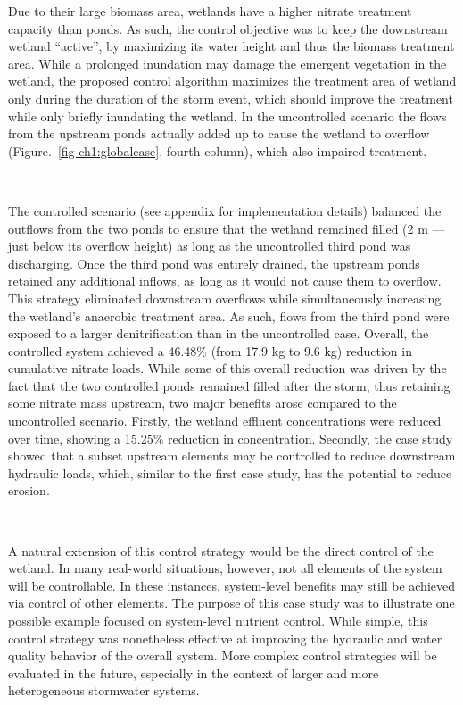Due to their large biomass area, wetlands have a higher nitrate treatment capacity than ponds\cite{Scholes2008APotentials}. 
As such, the control objective was to keep the downstream wetland ``active'', by
maximizing its water height and thus the biomass treatment area. While a prolonged  inundation may damage the emergent vegetation in the wetland, the proposed control algorithm maximizes the treatment area of wetland only during the duration of the storm event, which should improve the treatment while only briefly inundating the wetland.
In the uncontrolled scenario the flows from the upstream ponds actually added up to cause the wetland to overflow (Figure.~\ref{fig-ch1:globalcase}, fourth column), which also impaired treatment. 

\

The controlled scenario (see appendix for implementation details) balanced the outflows from the two ponds to ensure that the wetland remained filled (2 m --- just below its overflow height) as long as the uncontrolled third pond was discharging. Once the third pond was entirely drained, the upstream ponds retained any additional inflows, as long as it would not cause them to overflow. This strategy eliminated downstream overflows while simultaneously increasing the wetland's anaerobic treatment area. As such, flows from the third pond were exposed to a larger denitrification than in the uncontrolled case. Overall, the controlled system achieved a 46.48\% (from 17.9 kg to 9.6 kg) reduction in cumulative nitrate loads.  While some of this overall reduction was driven by the fact that the two controlled ponds remained filled after the storm, thus retaining some nitrate mass upstream, two major benefits arose compared to the uncontrolled scenario. Firstly, the wetland effluent concentrations were reduced over time, showing a 15.25\% reduction in concentration. Secondly, the case study showed that a subset upstream elements may be controlled to reduce downstream hydraulic loads, which, similar to the first case study, has the potential to reduce erosion. 

\

A natural extension of this control strategy would be the direct control of the wetland. In many real-world situations, however, not all elements of the system will be controllable. In these instances, system-level benefits may still be achieved via control of other elements. The purpose of this case study was to illustrate one possible example focused on system-level nutrient control. While simple, this control strategy was nonetheless effective at improving the hydraulic and water quality behavior of the overall system. More complex control strategies will be evaluated in the future, especially in the context of larger and more heterogeneous stormwater systems. 


